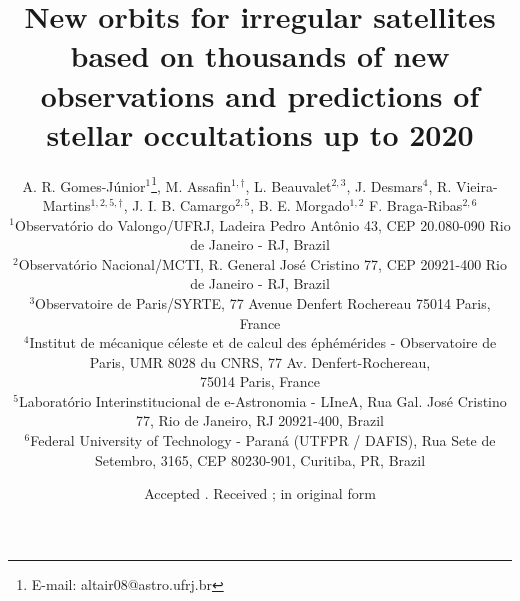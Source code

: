 \documentclass[useAMS,usenatbib]{mn2e}
\title[New orbits and predictions of stellar occultations by irregular satellites up to 2020]{New orbits for irregular satellites based on thousands of new observations and predictions of stellar occultations up to 2020}
\author[A. R. Gomes-J\'unior, M. Assafin, L. Beauvalet et al.]{A. R. Gomes-J\'unior$^{1}$\thanks{E-mail: altair08@astro.ufrj.br},
M. Assafin$^{1,\dag}$,
L. Beauvalet$^{2,3}$,
J. Desmars$^{4}$,
R. Vieira-Martins$^{1,2,5,\dag}$,\newauthor
J. I. B. Camargo$^{2,5}$,
B. E. Morgado$^{1,2}$
F. Braga-Ribas$^{2,6}$
\\
$^{1}$Observat\'orio do Valongo/UFRJ, Ladeira Pedro Ant\^onio 43,
CEP 20.080-090 Rio de Janeiro - RJ, Brazil\\
$^{2}$Observat\'orio Nacional/MCTI, R. General Jos\'e Cristino 77, CEP 20921-400 Rio de Janeiro - RJ, Brazil\\
$^{3}$Observatoire de Paris/SYRTE, 77 Avenue Denfert Rochereau 75014 Paris, France\\
$^{4}$Institut de m\'ecanique c\'eleste et de calcul des \'eph\'em\'erides - Observatoire de Paris, UMR 8028 du CNRS, 77 Av. Denfert-Rochereau,\\ 75014 Paris, France\\
$^{5}$Laborat\'orio Interinstitucional de e-Astronomia - LIneA, Rua Gal. Jos\'e Cristino 77, Rio de Janeiro, RJ 20921-400, Brazil\\
$^{6}$Federal University of Technology - Paran\'a (UTFPR / DAFIS), Rua Sete de Setembro, 3165, CEP 80230-901, Curitiba, PR, Brazil
}
\begin{document}
\newcommand{\noccs}{5442 } %

\date{Accepted . Received ; in original form }

\pagerange{\pageref{firstpage}--\pageref{lastpage}} 

\maketitle

\label{firstpage}

\begin{abstract}

\end{abstract}
\end{document}
